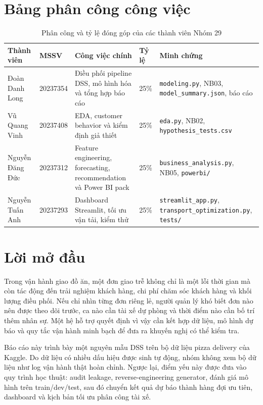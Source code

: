 \documentclass[12pt,a4paper,oneside]{report}
\newcommand{\code}[1]{\nolinkurl{#1}}
\begin{document}
\clearpage
\chapter*{Bảng phân công công việc}

\begin{table}[H]
\centering
\small
\caption*{Phân công và tỷ lệ đóng góp của các thành viên Nhóm 29}
\begin{tabularx}{\textwidth}{p{2.7cm}p{1.6cm}X p{0.9cm}p{3.1cm}}
\toprule
\textbf{Thành viên} & \textbf{MSSV} & \textbf{Công việc chính} &
\textbf{Tỷ lệ} & \textbf{Minh chứng}\\
\midrule
Đoàn Danh Long & 20237354 & Điều phối pipeline DSS, mô hình hóa và tổng hợp báo cáo & 25\% & \code{modeling.py}, NB03, \code{model\_summary.json}, báo cáo\\
Vũ Quang Vinh & 20237408 & EDA, customer behavior và kiểm định giả thiết & 25\% & \code{eda.py}, NB02, \code{hypothesis\_tests.csv}\\
Nguyễn Đăng Đức & 20237312 & Feature engineering, forecasting, recommendation và Power BI pack & 25\% & \code{business\_analysis.py}, NB05, \code{powerbi/}\\
Nguyễn Tuấn Anh & 20237293 & Dashboard Streamlit, tối ưu vận tải, kiểm thử & 25\% & \code{streamlit\_app.py}, \code{transport\_optimization.py}, \code{tests/}\\
\bottomrule
\end{tabularx}
\end{table}

\chapter*{Lời mở đầu}

Trong vận hành giao đồ ăn, một đơn giao trễ không chỉ là một lỗi thời gian mà
còn tác động đến trải nghiệm khách hàng, chi phí chăm sóc khách hàng và khối
lượng điều phối. Nếu chỉ nhìn từng đơn riêng lẻ, người quản lý khó biết đơn nào
nên được theo dõi trước, ca nào cần tài xế dự phòng và thời điểm nào cần bố trí
thêm nhân sự. Một hệ hỗ trợ quyết định vì vậy cần kết hợp dữ liệu, mô hình dự
báo và quy tắc vận hành minh bạch để đưa ra khuyến nghị có thể kiểm tra.

Báo cáo này trình bày một nguyên mẫu DSS trên bộ dữ liệu pizza delivery của
Kaggle. Do dữ liệu có nhiều dấu hiệu được sinh tự động, nhóm không xem bộ dữ
liệu như log vận hành thật hoàn chỉnh. Ngược lại, điểm yếu này được đưa vào
quy trình học thuật: audit leakage, reverse-engineering generator, đánh giá mô
hình trên train/dev/test, sau đó chuyển kết quả dự báo thành hàng đợi ưu tiên,
dashboard và kịch bản tối ưu phân công tài xế.
\end{document}
